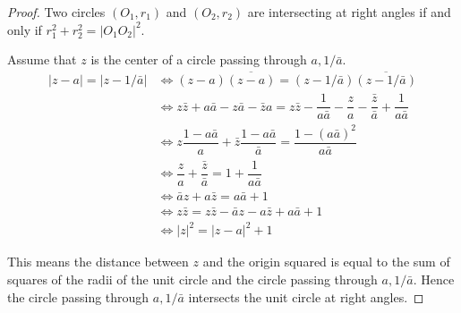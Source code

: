 \begin{proof}
	Two circles \( (O_{1}, r_{1}) \) and \( (O_{2}, r_{2}) \) are intersecting at right angles if and only if \( r_{1}^{2} + r_{2}^{2} = {\left\vert O_{1}O_{2} \right\vert}^{2} \).

	Assume that \( z \) is the center of a circle passing through \( a, 1/\bar{a} \).
	\begingroup
	\allowdisplaybreaks%
	\begin{align*}
		\left\vert z - a \right\vert = \left\vert z - 1/\bar{a} \right\vert & \iff (z - a)\overline{(z - a)} = (z - 1/\bar{a})\overline{(z - 1/\bar{a})}                                                                      \\
		                                                                    & \iff z\bar{z} + a\bar{a} - z\bar{a} - \bar{z}a = z\bar{z} - \dfrac{1}{a\bar{a}} - \dfrac{z}{a} - \dfrac{\bar{z}}{\bar{a}} + \dfrac{1}{a\bar{a}} \\
		                                                                    & \iff z\dfrac{1 - a\bar{a}}{a} + \bar{z}\dfrac{1 - a\bar{a}}{\bar{a}} = \dfrac{1 - {(a\bar{a})}^{2}}{a\bar{a}}                                   \\
		                                                                    & \iff \dfrac{z}{a} + \dfrac{\bar{z}}{\bar{a}} = 1 + \dfrac{1}{a\bar{a}}                                                                          \\
		                                                                    & \iff \bar{a}z + a\bar{z} = a\bar{a} + 1                                                                                                         \\
		                                                                    & \iff z\bar{z} = z\bar{z} - \bar{a}z - a\bar{z} + a\bar{a} + 1                                                                                   \\
		                                                                    & \iff {\left\vert z \right\vert}^{2} = {\left\vert z - a \right\vert}^{2} + 1
	\end{align*}
	\endgroup

	This means the distance between \( z \) and the origin squared is equal to the sum of squares of the radii of the unit circle and the circle passing through \( a, 1/\bar{a} \). Hence the circle passing through \( a, 1/\bar{a} \) intersects the unit circle at right angles.
\end{proof}

